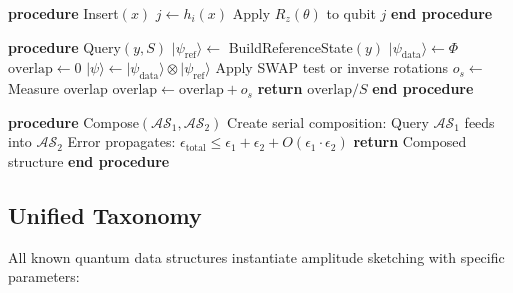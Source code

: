 \documentclass[11pt,letterpaper]{article}
\begin{document}
\begin{algorithm}
\caption{Amplitude Sketch Operations}
\label{alg:amplitude_sketch}
\begin{algorithmic}[1]
\STATE \textbf{procedure} Insert$(x)$
    \STATE $j \leftarrow h_i(x)$ 
    \STATE Apply $R_z(\theta)$ to qubit $j$ 
\ENDFOR
\STATE \textbf{end procedure}

\STATE

\STATE \textbf{procedure} Query$(y, S)$
\STATE $|\psi_{\text{ref}}\rangle \leftarrow$ BuildReferenceState$(y)$ 
\STATE $|\psi_{\text{data}}\rangle \leftarrow \Phi$ 
\STATE $\text{overlap} \leftarrow 0$
 
    \STATE $|\psi\rangle \leftarrow |\psi_{\text{data}}\rangle \otimes |\psi_{\text{ref}}\rangle$
    \STATE Apply SWAP test or inverse rotations
    \STATE $o_s \leftarrow$ Measure overlap
    \STATE $\text{overlap} \leftarrow \text{overlap} + o_s$
\ENDFOR
\STATE \textbf{return} $\text{overlap} / S$
\STATE \textbf{end procedure}

\STATE

\STATE \textbf{procedure} Compose$(\mathcal{AS}_1, \mathcal{AS}_2)$
\STATE Create serial composition: Query $\mathcal{AS}_1$ feeds into $\mathcal{AS}_2$
\STATE Error propagates: $\epsilon_{\text{total}} \leq \epsilon_1 + \epsilon_2 + O(\epsilon_1 \cdot \epsilon_2)$
\STATE \textbf{return} Composed structure
\STATE \textbf{end procedure}
\end{algorithmic}
\end{algorithm}

\subsection{Unified Taxonomy}

All known quantum data structures instantiate amplitude sketching with specific parameters:
\end{document}
